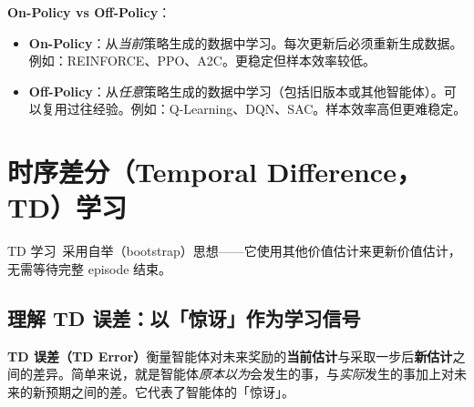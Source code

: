 \begin{keybox}[关键分类区分]
\textbf{On-Policy vs Off-Policy}：

\begin{itemize}
  \item \textbf{On-Policy}：从\emph{当前}策略生成的数据中学习。每次更新后必须重新生成数据。例如：REINFORCE、PPO、A2C。更稳定但样本效率较低。
  \item \textbf{Off-Policy}：从\emph{任意}策略生成的数据中学习（包括旧版本或其他智能体）。可以复用过往经验。例如：Q-Learning、DQN、SAC。样本效率高但更难稳定。
\end{itemize}
\end{keybox}

\section{时序差分（Temporal Difference，TD）学习}
\label{temporal-difference-td-learning}

TD 学习~\cite{sutton1988learning}采用自举（bootstrap）思想——它使用其他价值估计来更新价值估计，无需等待完整 episode 结束。

\subsection{理解 TD 误差：以「惊讶」作为学习信号}
\label{understanding-td-error-surprise-as-a-learning-signal}

\textbf{TD 误差（TD Error）}衡量智能体对未来奖励的\textbf{当前估计}与采取一步后\textbf{新估计}之间的差异。简单来说，就是智能体\emph{原本以为}会发生的事，与\emph{实际}发生的事加上对未来的新预期之间的差。它代表了智能体的「惊讶」。

